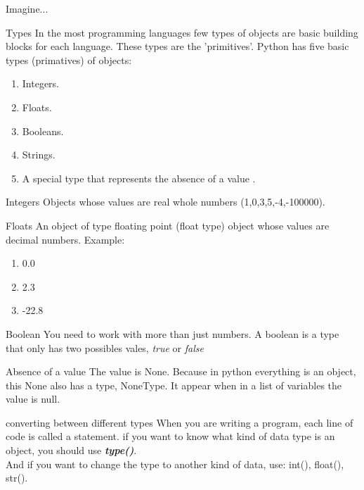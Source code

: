 \documentclass[aspectratio=169,19pt,english]{beamer}
\begin{document}
{\begin{frame}{Imagine...}
\end{frame}
\begin{frame}{Types}
	In the most programming languages few types of objects are basic building blocks for each language. These types are the 'primitives'.
    Python has five basic types (primatives) of objects: 
    \begin{enumerate}[label=\roman*.]
    	\item Integers.
    	\item Floats. 
    	\item Booleans.
    	\item Strings. 
    	\item A special type that represents the absence of a value .
    \end{enumerate}
\end{frame}


\begin{frame}{Integers}
	Objects whose values are real whole numbers (1,0,3,5,-4,-100000).\vspace{0.1cm}
\end{frame}
\begin{frame}{Floats}
	An object of type floating point (float type) object whose values are decimal numbers. Example: 
	\begin{enumerate}[label=\roman*.]
		\item 0.0
		\item 2.3
		\item -22.8
	\end{enumerate}
\end{frame}
\begin{frame}{Boolean}
	You need to work with more than just numbers. 
	A boolean is a type that only has two possibles vales, \textit{true} or \textit{false}
\end{frame}
\begin{frame}{Absence of a value}
	The value is None. Because in python everything is an object, this None also has a type, NoneType. It appear when in a list of variables the value is null.  
\end{frame}
\begin{frame}{converting between different types}
When you are writing a program, each line of code is called a statement. if you want to know what kind of data type is an object, you should use \textit{\textbf{type()}}.\\
And if you want to change the type to another kind of data, use: int(), float(), str().
\end{frame}
}
\end{document}
